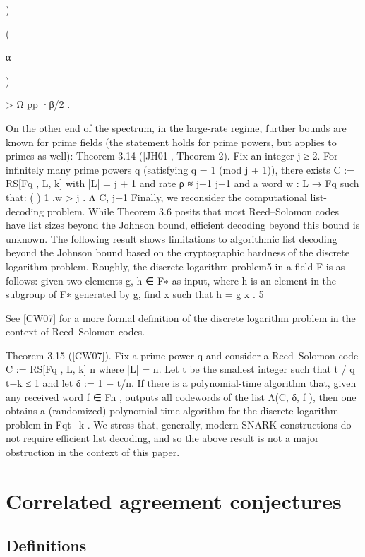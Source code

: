 \documentclass[11pt]{article}
\begin{document}
)

(

α

)

> Ω pp ·β/2 .

On the other end of the spectrum, in the large-rate regime, further bounds are known for prime
fields (the statement holds for prime powers, but applies to primes as well):
Theorem 3.14 ([JH01], Theorem 2). Fix an integer j ≥ 2. For infinitely many prime powers q
(satisfying q = 1 (mod j + 1)), there exists C := RS[Fq , L, k] with |L| = j + 1 and rate ρ ≈ j−1
j+1 and
a word w : L → Fq such that:
(
)
1
,w > j .
Λ C,
j+1
Finally, we reconsider the computational list-decoding problem. While Theorem 3.6 posits that
most Reed–Solomon codes have list sizes beyond the Johnson bound, efficient decoding beyond this
bound is unknown. The following result shows limitations to algorithmic list decoding beyond the
Johnson bound based on the cryptographic hardness of the discrete logarithm problem. Roughly,
the discrete logarithm problem5 in a field F is as follows: given two elements g, h ∈ F∗ as input,
where h is an element in the subgroup of F∗ generated by g, find x such that h = g x .
5

See [CW07] for a more formal definition of the discrete logarithm problem in the context of Reed–Solomon codes.

Theorem 3.15 ([CW07]). Fix a prime power q and consider
a Reed–Solomon code C := RS[Fq , L, k]
n
where |L| = n. Let t be the smallest integer such that t / q t−k ≤ 1 and let δ := 1 − t/n. If
there is a polynomial-time algorithm that, given any received word f ∈ Fn , outputs all codewords
of the list Λ(C, δ, f ), then one obtains a (randomized) polynomial-time algorithm for the discrete
logarithm problem in Fqt−k .
We stress that, generally, modern SNARK constructions do not require efficient list decoding,
and so the above result is not a major obstruction in the context of this paper.


\section{Correlated agreement conjectures}




\subsection{Definitions}
\end{document}
